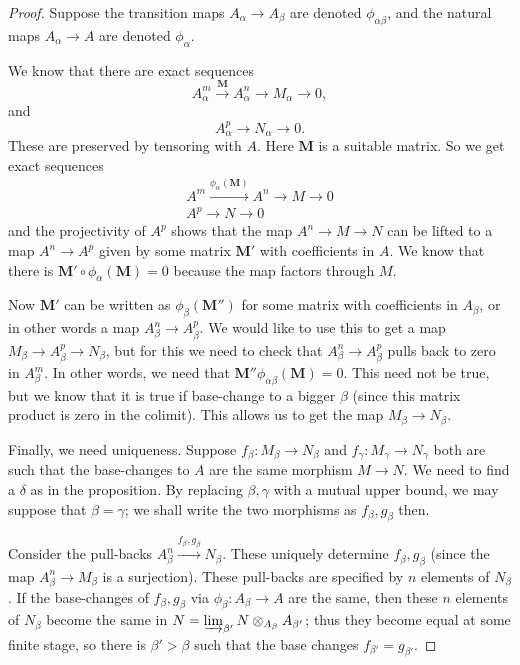 \begin{proof} Suppose the transition maps $A_\alpha \to A_\beta$ are denoted
$\phi_{\alpha \beta}$, and the natural maps $A_\alpha \to A$ are denoted
$\phi_\alpha$.

We know that there are exact sequences
\[ A_\alpha^m \stackrel{\textbf{M}}{\to} A_\alpha^n \to M_\alpha \to 0,  \]
and
\[ A_\alpha^p \to N_\alpha \to 0.  \]
These are preserved by tensoring with $A$. Here $\textbf{M}$ is a suitable matrix.
So we get exact sequences
\begin{gather*} 
A^m \stackrel{\phi_\alpha(\textbf{M})}{\to} A^n \to M \to 0 \\
A^p \to N \to 0
\end{gather*} 
and the projectivity of $A^p$ shows that the map $A^n \to M \to N$ can be
lifted to  a map $A^n \to A^p$ given by some matrix $\textbf{M}'$ with coefficients
in $A$. We know that there is $\textbf{M}'  \circ \phi_\alpha(\textbf{M}) = 0$
because the map factors through $M$. 

Now $\textbf{M}'$ can be written as $\phi_\beta(\textbf{M}'')$ for some matrix
with coefficients in $A_\beta$, or in other words a map $A_\beta^n \to
A_\beta^p$. We would like to use this to get a map $M_\beta \to A_\beta^p \to
N_\beta$, but for this we need to check that $A_\beta^n \to A_\beta^p$ pulls
back to zero in $A_\beta^m$. In other words, we need that
$\textbf{M}'' \phi_{\alpha \beta}( \textbf{M}) = 0$. This need not be true, but we know
that it is true if base-change to a bigger $\beta$ (since this matrix product
is zero in the colimit). This allows us to get the map $M_\beta \to N_\beta$.

Finally, we need uniqueness. Suppose $f_\beta: M_\beta \to N_\beta$ and
$f_\gamma: M_\gamma \to N_\gamma$ both are such that the base-changes to $A$
are the same morphism $M \to N$. We need to find a $\delta$ as in the
proposition. By replacing $\beta, \gamma$ with a mutual upper bound, we may
suppose that $\beta = \gamma$; we shall write the two morphisms as $f_\beta,
g_\beta$ then.

Consider the pull-backs $A_\beta^n \stackrel{f_\beta, g_\beta}{\to } N_\beta$.
These uniquely determine $f_\beta, g_\beta$ (since the map $A_\beta^n \to
M_\beta$ is a surjection). These pull-backs are specified by $n$ elements of
$N_\beta$. If the base-changes of $f_\beta, g_\beta$ via $\phi_{\beta}:
A_\beta \to A$ are the same, then these $n$ elements of $N_\beta$ become the
same in $N = \varinjlim_{\beta'} N \otimes_{A_\beta} A_{\beta'}$; thus they
become equal at some finite stage, so there is $\beta' > \beta$ such that the
base changes $f_{\beta'} = g_{\beta'}$.

\end{proof} 

